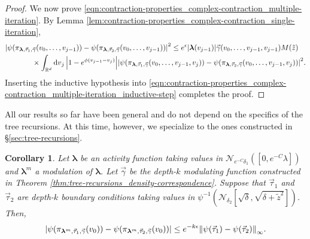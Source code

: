 \documentclass[11pt]{article}
\newcommand{\R}{\mathbb R}
\newcommand{\bl}{\bm{\lambda}}
\newcommand{\tz}{\tilde{z}}
\newcommand{\lsconst}{C}
\numberwithin{equation}{section}
\theoremstyle{plain}
\newtheorem{corollary}[theorem]{Corollary}
\theoremstyle{definition}
\theoremstyle{remark}
\begin{document}
\begin{proof}
We now prove \eqref{eqn:contraction-properties_complex-contraction_multiple-iteration}.
By Lemma \ref{lem:contraction-properties_complex-contraction_single-iteration},
\begin{equation}
\label{eqn:contraction-properties_complex-contraction_multiple-iteration_inductive-step}
\begin{multlined}
\abs{\psi(\pi_{\bl,\vec{\tau}_{1},\vec{\gamma}}(v_{0},\dots,v_{j-1}))
-\psi(\pi_{\bl,\vec{\tau}_{2},\vec{\gamma}}(v_{0},\dots,v_{j-1}))}^{2}
\le e^{\epsilon}\abs{\bl(v_{j-1})}
\vec{\gamma}(v_{0},\dots,v_{j-1},v_{j-1})
M(\tz)
\\
\times
\int_{\R^{d}}\dd{v}_{j}\abs{1-e^{\phi(v_{j-1}-v_{j})}}
\abs{\psi(\pi_{\bl,\vec{\tau}_{1},\vec{\gamma}}(v_{0},\dots,v_{j-1},v_{j}))
-\psi(\pi_{\bl,\vec{\tau}_{2},\vec{\gamma}}(v_{0},\dots,v_{j-1},v_{j}))}^{2}.
\end{multlined}
\end{equation}
Inserting the inductive hypothesis into \eqref{eqn:contraction-properties_complex-contraction_multiple-iteration_inductive-step} completes the proof.
\end{proof}

All our results so far have been general and do not depend on the specifics of the tree recursions.
At this time, however, we specialize to the ones constructed in \S\ref{sec:tree-recursions}.

\begin{corollary}
\label{cor:contraction-properties_complex-contraction_direct-estimate}
Let $\bl$ be an activity function taking values in $\mathcal{N}_{e^{-\lsconst}\delta_{1}}([0,e^{-\lsconst}\lambda])$ and $\bl^{m}$ a modulation of $\bl$.
Let $\vec{\gamma}$ be the depth-$k$ modulating function constructed in Theorem \ref{thm:tree-recursions_density-correspondence}.
Suppose that $\vec{\tau}_{1}$ and $\vec{\tau}_{2}$ are depth-$k$ boundary conditions taking values in $\psi^{-1}(\mathcal{N}_{\delta_{2}}[\sqrt{\delta},\sqrt{\delta+\tz^{2}}])$.
Then,
\begin{equation}
\abs{\psi(\pi_{\bl^{m},\vec{\tau}_{1},\vec{\gamma}}(v_{0}))
-\psi(\pi_{\bl^{m},\vec{\tau}_{2},\vec{\gamma}}(v_{0}))}
\le e^{-k \epsilon}
\norm{\psi(\vec{\tau}_{1})-\psi(\vec{\tau}_{2})}_{\infty}.
\end{equation}
\end{corollary}
\end{document}

